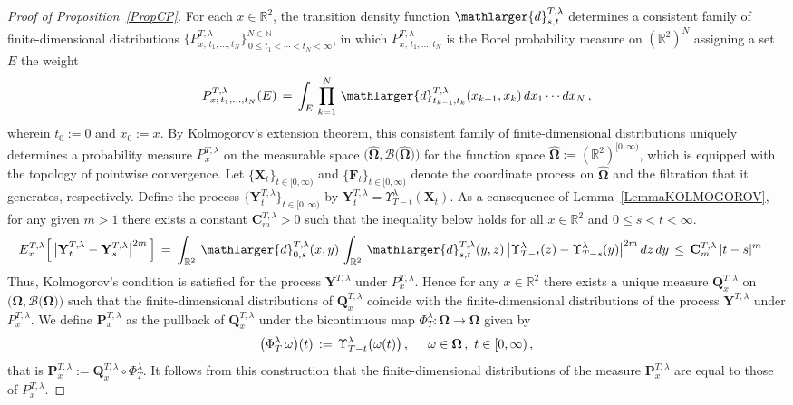 \documentclass[10pt]{article}
\numberwithin{equation}{section}
\theoremstyle{definition}
\newcommand{\R}{{\mathbb R}}
\newcommand{\Rphi}{{\Upsilon}}
\begin{document}
\begin{appendix}
\begin{proof}[Proof of Proposition~\ref{PropCP}] For each $x\in \R^2$, the   transition density function $  \mathlarger{d}_{s,t}^{T,\lambda }  $ determines a consistent family of finite-dimensional distributions $\{ P_{x;\,t_1,\ldots, t_N}^{T,\lambda} \}_{\,0\leq t_1<\cdots <t_N<\infty}^{N\in \mathbb{N}}$, in which $P_{x;\,t_1,\ldots, t_N}^{T,\lambda} $ is the Borel probability measure on $(\R^2)^N$  assigning a  set $E$ the weight
\begin{align}\label{FDD}
P_{x;\,t_1,\ldots, t_N}^{T,\lambda}(E)\,=\, \int_{E} \, \prod_{k=1}^N  \, \mathlarger{d}_{t_{k-1},t_k}^{T,\lambda}(x_{k-1},x_k)\,dx_1\cdots dx_N \,, 
\end{align}
wherein $t_0:=0$ and $x_0:=x$.  By Kolmogorov's extension theorem, this consistent family of finite-dimensional distributions  uniquely determines a probability measure $P^{T,\lambda}_x$ on the measurable space $\big(\mathbf{\widehat{\Omega}}  ,\mathscr{B}\big( \mathbf{\widehat{\Omega}}\big) \big)$ for the function space $\mathbf{\widehat{\Omega}}:=(\R^2)^{[0,\infty)}$, which is  equipped with the topology of pointwise convergence.  Let $\{\mathbf{X}_t\}_{t\in [0,\infty)}$ and $\{\mathbf{F}_t\}_{t\in [0,\infty)}$ denote the coordinate process on $\mathbf{\widehat{\Omega}}$ and  the filtration that it  generates, respectively.  Define the process $\{ \mathbf{Y}^{T,\lambda}_t \}_{t\in [0,\infty)}$  by $\mathbf{Y}^{T,\lambda}_t=\Rphi_{T-t}^{\lambda}(\mathbf{X}_t)$.
 As a consequence of Lemma~\ref{LemmaKOLMOGOROV}, for any given $m>1$ there exists a constant $\mathbf{C}^{T,\lambda}_m>0$ such that the inequality below holds  for all $x\in \R^2$ and $0\leq s<t<\infty$.
\begin{align*}
E^{T,\lambda}_{x}\Big[\, \big|\mathbf{Y}^{T,\lambda}_t-\mathbf{Y}^{T,\lambda}_s \big|^{2m}\, \Big]\,=\,&\,\int_{\R^2}  \,\mathlarger{d}_{0,s}^{T,\lambda}(x,y)\,\int_{\R^2} \, \mathlarger{d}_{s,t}^{T,\lambda}(y,z)\,\big| \Rphi_{T-t}^{\lambda}(z)-\Rphi_{T-s}^{\lambda} (y) \big|^{2m}\, dz\, dy  \,\leq \, \mathbf{C}^{T,\lambda}_m\,|t-s|^m
\end{align*}
 Thus, Kolmogorov's condition is satisfied for the process $\mathbf{Y}^{T,\lambda} $ under $P^{T,\lambda}_x$. Hence for any $x\in \R^2$ there exists a unique   measure $\mathbf{Q}^{T,\lambda}_x $ on $\big(\boldsymbol{\Omega}, \mathscr{B}\big( \boldsymbol{\Omega}  \big) \big)$ such that 
 the finite-dimensional distributions of $\mathbf{Q}^{T,\lambda}_x$ coincide with the finite-dimensional distributions of the process $\mathbf{Y}^{T,\lambda}$ under $P_{x}^{T,\lambda}$.  We define $\mathbf{P}^{T,\lambda}_x$ as the pullback of  $\mathbf{Q}^{T,\lambda}_x$ under  the bicontinuous map  $\Phi_{T}^{\lambda}:\boldsymbol{\Omega}\rightarrow \boldsymbol{\Omega}$ given by
$$  \big(\Phi_{T}^{\lambda} \, \omega\big)(t)\,:=\, \Rphi_{T-t}^{\lambda}\big(\omega(t)  \big) \,, \hspace{.5cm} \omega \in \boldsymbol{\Omega}\,,\,\,t\in [0,\infty)\,,  $$
that is $\mathbf{P}^{T,\lambda}_x:=\mathbf{Q}^{T,\lambda}_x\circ \Phi_{T}^{\lambda}$.   It follows from this construction that the finite-dimensional distributions of the measure $\mathbf{P}^{T,\lambda}_x$ are equal to those of $P_{x}^{T,\lambda}$. 


\end{proof}
\end{appendix}
\end{document}
